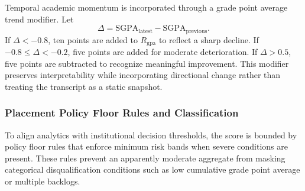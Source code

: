 \documentclass{article}
\begin{document}
Temporal academic momentum is incorporated through a grade point average trend modifier. Let
\begin{equation}
\Delta = \mathrm{SGPA}_{\mathrm{latest}} - \mathrm{SGPA}_{\mathrm{previous}}.
\end{equation}
If $\Delta < -0.8$, ten points are added to $R_{\mathrm{gpa}}$ to reflect a sharp decline. If $-0.8 \leq \Delta < -0.2$, five points are added for moderate deterioration. If $\Delta > 0.5$, five points are subtracted to recognize meaningful improvement. This modifier preserves interpretability while incorporating directional change rather than treating the transcript as a static snapshot.

\subsubsection{Placement Policy Floor Rules and Classification}
To align analytics with institutional decision thresholds, the score is bounded by policy floor rules that enforce minimum risk bands when severe conditions are present. These rules prevent an apparently moderate aggregate from masking categorical disqualification conditions such as low cumulative grade point average or multiple backlogs.

\begin{table}[t]
\caption{Placement Policy Floor Rules}
\label{tab:floor-rules}
\centering
{}
\end{table}

\begin{table}[t]
\caption{SARS Risk Level Classification}
\label{tab:risk-levels}
\centering
{}
\end{table}
\end{document}
